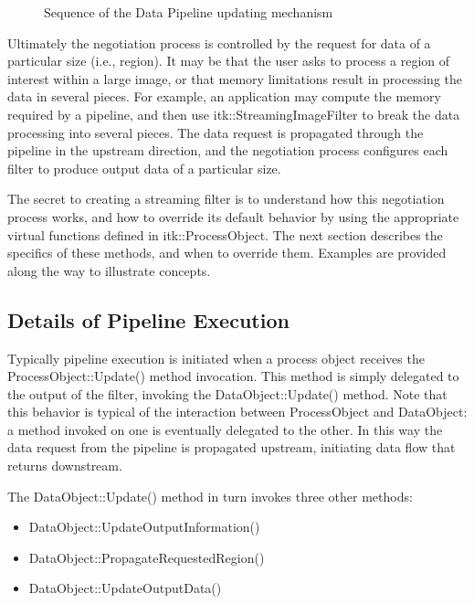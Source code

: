 \begin{figure}
  \par\centering
  \caption{\label{fig:DataPipeLineUpdate}Sequence of the Data Pipeline updating mechanism}
  \par
\end{figure}


Ultimately the negotiation process is controlled by the request for data of a
particular size (i.e., region). It may be that the user asks to process a
region of interest within a large image, or that memory limitations result in
processing the data in several pieces. For example, an application may
compute the memory required by a pipeline, and then use
itk::StreamingImageFilter to break the data processing into several pieces.
The data request is propagated through the pipeline in the upstream
direction, and the negotiation process configures each filter to produce
output data of a particular size.

The secret to creating a streaming filter is to understand how this
negotiation process works, and how to override its default behavior by using
the appropriate virtual functions defined in itk::ProcessObject. The next
section describes the specifics of these methods, and when to override
them. Examples are provided along the way to illustrate concepts.


\subsection{Details of Pipeline Execution}
\label{sec:DetailsPipelineExecution}

Typically pipeline execution is initiated when a process object receives the
ProcessObject::Update() method invocation. This method is simply delegated to
the output of the filter, invoking the DataObject::Update() method. Note that
this behavior is typical of the interaction between ProcessObject and
DataObject: a method invoked on one is eventually delegated to the other. In
this way the data request from the pipeline is propagated upstream,
initiating data flow that returns downstream.

The DataObject::Update() method in turn invokes three other methods:

\begin{itemize}
        \item DataObject::UpdateOutputInformation()
        \item DataObject::PropagateRequestedRegion()
        \item DataObject::UpdateOutputData()
\end{itemize}

